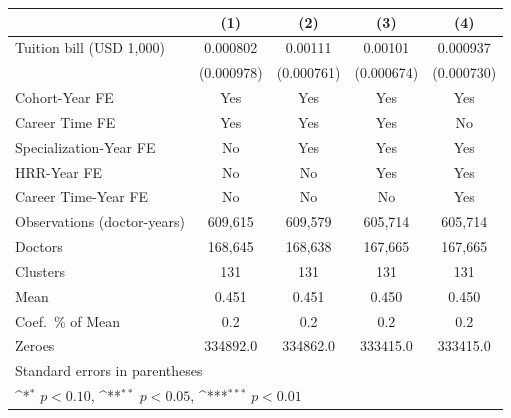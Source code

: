 {
\def\sym#1{\ifmmode^{#1}\else\(^{#1}\)\fi}
\begin{tabular}{l*{4}{c}}
\hline\hline
                    &\multicolumn{1}{c}{(1)}         &\multicolumn{1}{c}{(2)}         &\multicolumn{1}{c}{(3)}         &\multicolumn{1}{c}{(4)}         \\
\hline
Tuition bill (USD 1,000)&    0.000802         &     0.00111         &     0.00101         &    0.000937         \\
                    &  (0.000978)         &  (0.000761)         &  (0.000674)         &  (0.000730)         \\
[1em]
Cohort-Year FE      &         Yes         &         Yes         &         Yes         &         Yes         \\
[1em]
Career Time FE      &         Yes         &         Yes         &         Yes         &          No         \\
[1em]
Specialization-Year FE&          No         &         Yes         &         Yes         &         Yes         \\
[1em]
HRR-Year FE         &          No         &          No         &         Yes         &         Yes         \\
[1em]
Career Time-Year FE &          No         &          No         &          No         &         Yes         \\
\hline
Observations (doctor-years)&     609,615         &     609,579         &     605,714         &     605,714         \\
Doctors             &     168,645         &     168,638         &     167,665         &     167,665         \\
Clusters            &         131         &         131         &         131         &         131         \\
Mean                &       0.451         &       0.451         &       0.450         &       0.450         \\
Coef.\ \% of Mean   &         0.2         &         0.2         &         0.2         &         0.2         \\
Zeroes              &    334892.0         &    334862.0         &    333415.0         &    333415.0         \\
\hline\hline
\multicolumn{5}{l}{\footnotesize Standard errors in parentheses}\\
\multicolumn{5}{l}{\footnotesize \sym{*} \(p<0.10\), \sym{**} \(p<0.05\), \sym{***} \(p<0.01\)}\\
\end{tabular}
}
